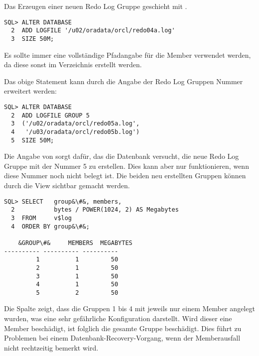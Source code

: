         Das Erzeugen einer neuen Redo Log Gruppe geschieht mit .
          \begin{lstlisting}[caption={Erzeugen einer Redo Log Gruppe},label=admin30,language=oracle_sql]
SQL> ALTER DATABASE
  2  ADD LOGFILE '/u02/oradata/orcl/redo04a.log'
  3  SIZE 50M;
          \end{lstlisting}
          \begin{merke}
            Es sollte immer eine vollst\"andige Pfadangabe f\"ur die Member verwendet werden, da diese sonst im Verzeichnis  erstellt werden.
          \end{merke}
          Das obige Statement kann durch die Angabe der Redo Log Gruppen Nummer erweitert werden:
          \begin{lstlisting}[caption={Erzeugen einer Redo Log Gruppe mit Angabe der Gruppennummer},label=admin31,language=oracle_sql]
SQL> ALTER DATABASE
  2  ADD LOGFILE GROUP 5
  3  ('/u02/oradata/orcl/redo05a.log',
  4   '/u03/oradata/orcl/redo05b.log')
  5  SIZE 50M;
          \end{lstlisting}
          Die Angabe von  sorgt daf\"ur, das die Datenbank versucht, die neue Redo Log Gruppe mit der Nummer 5 zu erstellen. Dies kann aber nur funktionieren, wenn diese Nummer noch nicht belegt ist. Die beiden neu erstellten Gruppen k\"onnen durch die View  sichtbar gemacht werden.
          \begin{lstlisting}[caption={Die View \identifier{v\$log}},label=admin32,language=oracle_sql]
SQL> SELECT   group&\#&, members,
  2           bytes / POWER(1024, 2) AS Megabytes
  3  FROM     v$log
  4  ORDER BY group&\#&;

    &GROUP\#&     MEMBERS  MEGABYTES
---------- ---------- ----------
         1          1         50
         2          1         50
         3          1         50
         4          1         50
         5          2         50
          \end{lstlisting}
          Die Spalte  zeigt, dass die Gruppen 1 bis 4 mit jeweils nur einem Member angelegt wurden, was eine sehr gef\"ahrliche Konfiguration darstellt. Wird dieser eine Member besch\"adigt, ist folglich die gesamte Gruppe besch\"adigt. Dies f\"uhrt zu Problemen bei einem Datenbank-Recovery-Vorgang, wenn der Memberausfall nicht rechtzeitig bemerkt wird.
